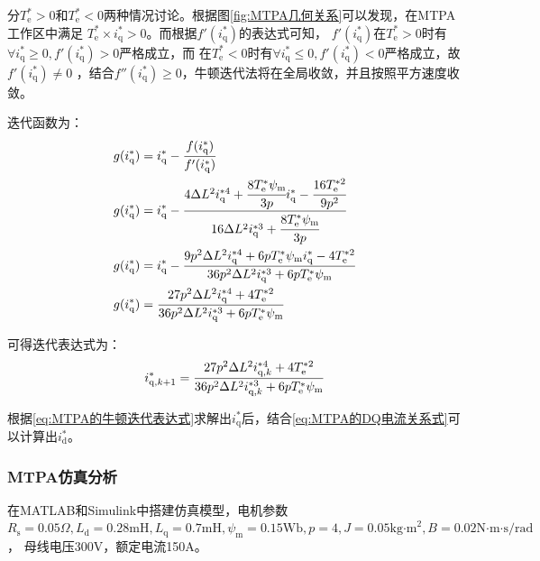 分\(T_{\mathrm{e}}^*>0\)和\(T_{\mathrm{e}}^*<0\)两种情况讨论。根据图\ref{fig:MTPA几何关系}可以发现，在MTPA工作区中满足 
\(T_{\mathrm{e}}^*\times i_{\mathrm{q}}^*>0\)。而根据\(f'(i_{\mathrm{q}}^*)\)的表达式可知，
\(f'(i_{\mathrm{q}}^*)\)在\(T_{\mathrm{e}}^*>0\)时有\(\forall i_{\mathrm{q}}^*\ge 0,f'(i_{\mathrm{q}}^*)>0\)严格成立，而
在\(T_{\mathrm{e}}^*<0\)时有\(\forall i_{\mathrm{q}}^*\le 0,f'(i_{\mathrm{q}}^*)<0\)严格成立，故\(f'(i_{\mathrm{q}}^*)\ne 0\)
，结合\(f''(i_{\mathrm{q}}^*)\ge 0\)，牛顿迭代法将在全局收敛，并且按照平方速度收敛。

迭代函数为：
\begin{align*}
    g(i_{\mathrm{q}}^*)&=i_{\mathrm{q}}^*-\cfrac{f(i_{\mathrm{q}}^*)}{f'(i_{\mathrm{q}}^*)}\notag\\
    g(i_{\mathrm{q}}^*)&=i_{\mathrm{q}}^*-\cfrac{4\Delta L^2i_{\mathrm{q}}^{*4}+\cfrac{8T_{\mathrm{e}}^*\psi_{\mathrm{m}}}{3p}i_{\mathrm{q}}^*-\cfrac{16T_{\mathrm{e}}^{*2}}{9p^2}}
    {16\Delta L^2i_{\mathrm{q}}^{*3}+\cfrac{8T_{\mathrm{e}}^*\psi_{\mathrm{m}}}{3p}}\notag\\
    g(i_{\mathrm{q}}^*)&=i_{\mathrm{q}}^*-\cfrac{9p^2\Delta L^2i_{\mathrm{q}}^{*4}+6pT_{\mathrm{e}}^*\psi_{\mathrm{m}}i_{\mathrm{q}}^*-4T_{\mathrm{e}}^{*2}}
    {36p^2\Delta L^2i_{\mathrm{q}}^{*3}+6pT_{\mathrm{e}}^*\psi_{\mathrm{m}}}\notag\\
    g(i_{\mathrm{q}}^*)&=\cfrac{27p^2\Delta L^2i_{\mathrm{q}}^{*4}+4T_{\mathrm{e}}^{*2}}{36p^2\Delta L^2i_{\mathrm{q}}^{*3}+6pT_{\mathrm{e}}^*\psi_{\mathrm{m}}}
\end{align*}

可得迭代表达式为：
\begin{equation}
    i_{\mathrm{q},k+1}^*=\cfrac{27p^2\Delta L^2i_{\mathrm{q},k}^{*4}+4T_{\mathrm{e}}^{*2}}{36p^2\Delta L^2i_{\mathrm{q},k}^{*3}+6pT_{\mathrm{e}}^*\psi_{\mathrm{m}}}
    \label{eq:MTPA的牛顿迭代表达式}
\end{equation}

根据\eqref{eq:MTPA的牛顿迭代表达式}求解出\(i_{\mathrm{q}}^*\)后，结合\eqref{eq:MTPA的DQ电流关系式}可以计算出\(i_{\mathrm{d}}^*\)。

\subsubsection{MTPA仿真分析}
在MATLAB和Simulink中搭建仿真模型，电机参数\(R_{\mathrm{s}}=0.05\Omega,L_{\mathrm{d}}=0.28\text{mH},
L_{\mathrm{q}}=0.7\text{mH},\psi_{\mathrm{m}}=0.15\text{Wb},p=4,J=0.05\text{kg·m}^2,B=0.02\text{N·m·s/rad}\)，
母线电压300V，额定电流150A。

